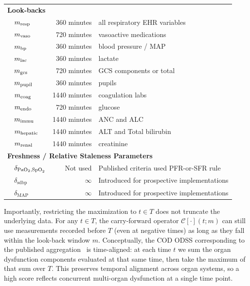 \documentclass[letterpaper,10pt]{article}
\begin{document}
\begin{longtable}{lrl}
  \multicolumn{3}{l}{\textbf{Look-backs}} \\
  \rowcolor{gray!20}
    ~~$m_{\mathrm{resp}}$  &  360 minutes & all respiratory EHR variables \\
    ~~$m_{\mathrm{vaso}}$  &  720 minutes & vasoactive medications \\
  \rowcolor{gray!20}
    ~~$m_{\mathrm{bp}}$   &  360 minutes & blood pressure / MAP \\
    ~~$m_{\mathrm{lac}}$   &  360 minutes & lactate \\
  \rowcolor{gray!20}
    ~~$m_{\mathrm{gcs}}$   &  720 minutes & GCS components or total \\
    ~~$m_{\mathrm{pupil}}$ &  360 minutes & pupils \\
  \rowcolor{gray!20}
    ~~$m_{\mathrm{coag}}$  & 1440 minutes & coagulation labs \\
    ~~$m_{\mathrm{endo}}$  &  720 minutes & glucose \\
  \rowcolor{gray!20}
    ~~$m_{\mathrm{immu}}$  & 1440 minutes & ANC and ALC \\
    ~~$m_{\mathrm{hepatic}}$  & 1440 minutes & ALT and Total bilirubin \\
  \rowcolor{gray!20}
    ~~$m_{\mathrm{renal}}$  & 1440 minutes & creatinine \\

  \multicolumn{3}{l}{\textbf{Freshness / Relative Staleness Parameters}} \\
  \rowcolor{gray!20}
    ~~$\delta_{\mathrm{PaO}_{2},\mathrm{SpO}_{2}}$ & Not used & Published criteria used PFR-or-SFR rule \\
    ~~$\delta_{\mathrm{sdbp}}$ & $\infty$   & Introduced for prospective implementations \\
  \rowcolor{gray!20}
    ~~$\delta_{\mathrm{MAP}}$ & $\infty$ &    Introduced for prospective implementations \\

\end{longtable}

Importantly, restricting the maximization to $t \in T$ does not truncate the
underlying data. For any $t \in T$, the carry-forward operator
$\mathcal{C}[\cdot](t;m)$ can still use measurements recorded before $T$ (even
at negative times) as long as they fall within the look-back window $m$.
Conceptually, the COD ODSS corresponding to the published
aggregation~\citep{Sanchez-Pinto2024,Schlapbach2024} is time-aligned: at each
time $t$ we sum the organ dysfunction components evaluated at that same time,
then take the maximum of that sum over $T$. This preserves temporal alignment
across organ systems, so a high score reflects concurrent multi-organ
dysfunction at a single time point.
\end{document}
